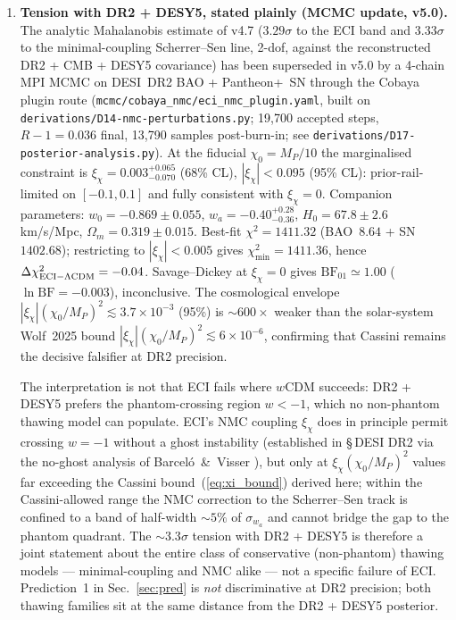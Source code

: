 \documentclass[epjc3,twocolumn]{svjour3}
\begin{document}
\begin{enumerate}
  tension discussed below. See \texttt{derivations/D10-report.md} for the full cross-check.
\item \textbf{Tension with DR2 + DESY5, stated plainly (MCMC update, v5.0).}
  The analytic Mahalanobis estimate of v4.7 ($3.29\sigma$ to the ECI band and
  $3.33\sigma$ to the minimal-coupling Scherrer--Sen line, 2-dof, against the
  reconstructed DR2 + CMB + DESY5 covariance) has been superseded in v5.0 by a
  4-chain MPI MCMC on DESI~DR2 BAO + Pantheon+~SN through the Cobaya plugin route
  (\texttt{mcmc/cobaya\_nmc/eci\_nmc\_plugin.yaml}, built on
  \texttt{derivations/D14-nmc-perturbations.py}; 19{,}700 accepted steps,
  $R-1=0.036$ final, 13{,}790 samples post-burn-in; see
  \texttt{derivations/D17-posterior-analysis.py}). At the fiducial
  $\chi_0=M_P/10$ the marginalised constraint is
  $\xi_\chi=0.003^{+0.065}_{-0.070}$ (68\% CL), $|\xi_\chi|<0.095$ (95\% CL):
  prior-rail-limited on $[-0.1,0.1]$ and fully consistent with $\xi_\chi=0$.
  Companion parameters: $w_0=-0.869\pm0.055$, $w_a=-0.40^{+0.28}_{-0.36}$,
  $H_0=67.8\pm2.6$\,km/s/Mpc, $\Omega_m=0.319\pm0.015$. Best-fit
  $\chi^2=1411.32$ (BAO~$8.64$ + SN~$1402.68$); restricting to $|\xi_\chi|<0.005$
  gives $\chi^2_{\min}=1411.36$, hence $\Delta\chi^2_{\rm ECI-\Lambda CDM}=-0.04$.
  Savage--Dickey at $\xi_\chi=0$ gives $\mathrm{BF}_{01}\simeq 1.00$
  ($\ln\mathrm{BF}=-0.003$), inconclusive. The cosmological envelope
  $|\xi_\chi|(\chi_0/M_P)^2\lesssim 3.7\!\times\!10^{-3}$ (95\%) is $\sim\!600\times$
  weaker than the solar-system Wolf~2025 bound
  $|\xi_\chi|(\chi_0/M_P)^2\lesssim 6\!\times\!10^{-6}$, confirming that Cassini
  remains the decisive falsifier at DR2 precision.

  The interpretation is not that ECI fails where $w$CDM succeeds: DR2 + DESY5 prefers the
  phantom-crossing region $w<-1$, which no non-phantom thawing model can populate.
  ECI's NMC coupling $\xi_\chi$ does in principle permit crossing $w=-1$ without a ghost
  instability (established in \S\,DESI DR2 via the no-ghost analysis of Bar\-ce\-l\'o~\&~Visser
  \cite{BarceloVisser2000}), but only at $\xi_\chi(\chi_0/M_P)^2$ values far exceeding the
  Cassini bound~(\ref{eq:xi_bound}) derived here; within the Cassini-allowed range
  the NMC correction to the Scherrer--Sen track is confined to a band of half-width
  $\sim\!5\%$ of $\sigma_{w_a}$ and cannot bridge the gap to the phantom quadrant. The
  $\sim\!3.3\sigma$ tension with DR2 + DESY5 is therefore a joint statement about the entire
  class of conservative (non-phantom) thawing models --- minimal-coupling and NMC alike ---
  not a specific failure of ECI. Prediction~1 in Sec.~\ref{sec:pred} is \emph{not}
  discriminative at DR2 precision; both thawing families sit at the same distance from
  the DR2 + DESY5 posterior.


\end{enumerate}
\end{document}
